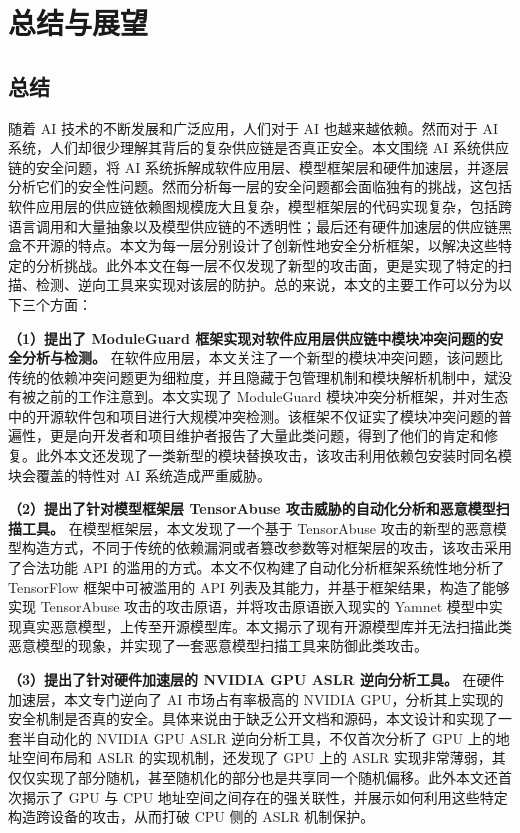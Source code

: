 \chapter{总结与展望}
\section{总结}
随着 AI 技术的不断发展和广泛应用，人们对于 AI 也越来越依赖。然而对于 AI 系统，人们却很少理解其背后的复杂供应链是否真正安全。本文围绕 AI 系统供应链的安全问题，将 AI 系统拆解成软件应用层、模型框架层和硬件加速层，并逐层分析它们的安全性问题。然而分析每一层的安全问题都会面临独有的挑战，这包括软件应用层的供应链依赖图规模庞大且复杂，模型框架层的代码实现复杂，包括跨语言调用和大量抽象以及模型供应链的不透明性；最后还有硬件加速层的供应链黑盒不开源的特点。本文为每一层分别设计了创新性地安全分析框架，以解决这些特定的分析挑战。此外本文在每一层不仅发现了新型的攻击面，更是实现了特定的扫描、检测、逆向工具来实现对该层的防护。总的来说，本文的主要工作可以分为以下三个方面：

\textbf{（1）提出了 ModuleGuard 框架实现对软件应用层供应链中模块冲突问题的安全分析与检测。} 在软件应用层，本文关注了一个新型的模块冲突问题，该问题比传统的依赖冲突问题更为细粒度，并且隐藏于包管理机制和模块解析机制中，斌没有被之前的工作注意到。本文实现了 ModuleGuard 模块冲突分析框架，并对生态中的开源软件包和项目进行大规模冲突检测。该框架不仅证实了模块冲突问题的普遍性，更是向开发者和项目维护者报告了大量此类问题，得到了他们的肯定和修复。此外本文还发现了一类新型的模块替换攻击，该攻击利用依赖包安装时同名模块会覆盖的特性对 AI 系统造成严重威胁。

\textbf{（2）提出了针对模型框架层 TensorAbuse 攻击威胁的自动化分析和恶意模型扫描工具。} 在模型框架层，本文发现了一个基于 TensorAbuse 攻击的新型的恶意模型构造方式，不同于传统的依赖漏洞或者篡改参数等对框架层的攻击，该攻击采用了合法功能 API 的滥用的方式。本文不仅构建了自动化分析框架系统性地分析了 TensorFlow 框架中可被滥用的 API 列表及其能力，并基于框架结果，构造了能够实现 TensorAbuse 攻击的攻击原语，并将攻击原语嵌入现实的 Yamnet 模型中实现真实恶意模型，上传至开源模型库。本文揭示了现有开源模型库并无法扫描此类恶意模型的现象，并实现了一套恶意模型扫描工具来防御此类攻击。

\textbf{（3）提出了针对硬件加速层的 NVIDIA GPU ASLR 逆向分析工具。}
在硬件加速层，本文专门逆向了 AI 市场占有率极高的 NVIDIA GPU，分析其上实现的安全机制是否真的安全。具体来说由于缺乏公开文档和源码，本文设计和实现了一套半自动化的 NVIDIA GPU ASLR 逆向分析工具，不仅首次分析了 GPU 上的地址空间布局和 ASLR 的实现机制，还发现了 GPU 上的 ASLR 实现非常薄弱，其仅仅实现了部分随机，甚至随机化的部分也是共享同一个随机偏移。此外本文还首次揭示了 GPU 与 CPU 地址空间之间存在的强关联性，并展示如何利用这些特定构造跨设备的攻击，从而打破 CPU 侧的 ASLR 机制保护。

